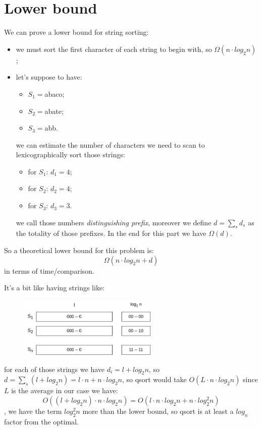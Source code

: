 \section{Lower bound}
We can prove a lower bound for string sorting:
\begin{itemize}
    \item we must sort the first character of each string to begin with, so $\Omega(n \cdot log_2 n)$;
    \item let's suppose to have:
    \begin{itemize}
        \item $S_1 = $abaco;
        \item $S_2 = $abate;
        \item $S_3 = $abb.
    \end{itemize}
    we can estimate the number of characters we need to scan to lexicographically sort those strings:
    \begin{itemize}
        \item for $S_1$: $d_1 = 4$;
        \item for $S_2$: $d_2 = 4$;
        \item for $S_3$: $d_3 = 3$.
    \end{itemize}
    we call those numbers \emph{distinguishing prefix}, moreover we define $d = \sum_s d_s$ as the totality of those prefixes.
    In the end for this part we have $\Omega(d)$.
\end{itemize}
So a theoretical lower bound for this problem is:
$$
    \Omega( n \cdot log_2 n + d)
$$
in terms of time/comparison.

It's a bit like having strings like:
\begin{figure}[H]
    \centering
    \includegraphics[width=250px]{images/5_String_sorting/string_sorting_lower_bound.png}
\end{figure}
for each of those strings we have $d_i = l + log_2 n$, so $d = \sum_s (l + log_2 n) = l \cdot n + n \cdot log_2 n$, so qsort would take $O(L \cdot n \cdot log_2 n)$ since $L$ is the average in our case we have:
$$
    O((l + log_2 n) \cdot n \cdot log_2 n) = O(l \cdot n \cdot log_2 n + n \cdot log_2^2 n)
$$, we have the term $log_2^2 n$ more than the lower bound, so qsort is at least a $log_n$ factor from the optimal.

